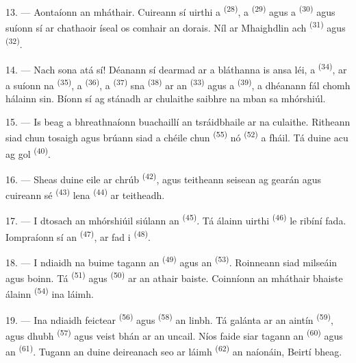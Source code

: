 13. --- Aontaíonn an mháthair. Cuireann sí uirthi a 
\textsuperscript{(28)}, a  \textsuperscript{(29)} agus a
 \textsuperscript{(30)} agus suíonn sí ar chathaoir íseal os comhair
an dorais. Níl ar Mhaighdlin ach  \textsuperscript{(31)} agus
 \textsuperscript{(32)}.

14. --- Nach sona atá sí! Déanann sí dearmad ar a bláthanna is ansa léi, a
 \textsuperscript{(34)}, ar a suíonn na 
\textsuperscript{(35)}, a  \textsuperscript{(36)}, a
 \textsuperscript{(37)} sna 
\textsuperscript{(38)} ar an  \textsuperscript{(33)} agus a
 \textsuperscript{(39)}, a dhéanann fál chomh hálainn sin. Bíonn sí
ag stánadh ar chulaithe saibhre na mban sa mhórshiúl.

15. --- Is beag a bhreathnaíonn buachaillí an tsráidbhaile ar na culaithe. Ritheann
siad chun tosaigh agus brúann siad a chéile chun  \textsuperscript{(55)} nó
 \textsuperscript{(52)} a fháil. Tá duine acu ag gol
\textsuperscript{(40)}.

16. --- Sheas duine eile ar chrúb  \textsuperscript{(42)}, agus
teitheann seisean ag gearán agus cuireann sé 
\textsuperscript{(43)} lena  \textsuperscript{(44)} ar teitheadh.

\VUsaut{5.0mm}
\VUsaut{4.0mm}

17. --- I dtosach an mhórshiúil siúlann an 
\textsuperscript{(45)}. Tá  álainn uirthi \textsuperscript{(46)} le
ribíní fada. Iompraíonn sí an  \textsuperscript{(47)},
ar fad i  \textsuperscript{(48)}.

18. --- I ndiaidh na buime tagann an 
\textsuperscript{(49)} agus an  \textsuperscript{(53)}.
Roinneann siad milseáin agus boinn. Tá 
\textsuperscript{(51)} agus  \textsuperscript{(50)} ar an athair
baiste. Coinníonn an mháthair bhaiste  álainn
\textsuperscript{(54)} ina láimh.

19. --- Ina ndiaidh feictear  \textsuperscript{(56)} agus
 \textsuperscript{(58)} an linbh. Tá  galánta ar an
aintín \textsuperscript{(59)}, agus  dhubh
\textsuperscript{(57)} agus veist bhán ar an uncail. Níos faide siar tagann an
 \textsuperscript{(60)} agus an 
\textsuperscript{(61)}. Tugann an duine deireanach seo ar láimh 
\textsuperscript{(62)} an naíonáin, Beirtí bheag.

